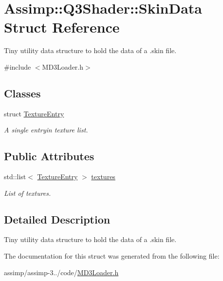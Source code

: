 \hypertarget{struct_assimp_1_1_q3_shader_1_1_skin_data}{\section{Assimp\+:\+:Q3\+Shader\+:\+:Skin\+Data Struct Reference}
\label{struct_assimp_1_1_q3_shader_1_1_skin_data}
}


Tiny utility data structure to hold the data of a .skin file.  




{\ttfamily \#include $<$M\+D3\+Loader.\+h$>$}

\subsection*{Classes}
\begin{DoxyCompactItemize}
\item 
struct \hyperlink{struct_assimp_1_1_q3_shader_1_1_skin_data_1_1_texture_entry}{Texture\+Entry}
\begin{DoxyCompactList}\small\item\em A single entryin texture list. \end{DoxyCompactList}\end{DoxyCompactItemize}
\subsection*{Public Attributes}
\begin{DoxyCompactItemize}
\item 
\hypertarget{struct_assimp_1_1_q3_shader_1_1_skin_data_ac2f3c7b1b8779e6cfcb8f4a7867d5855}{std\+::list$<$ \hyperlink{struct_assimp_1_1_q3_shader_1_1_skin_data_1_1_texture_entry}{Texture\+Entry} $>$ \hyperlink{struct_assimp_1_1_q3_shader_1_1_skin_data_ac2f3c7b1b8779e6cfcb8f4a7867d5855}{textures}}\label{struct_assimp_1_1_q3_shader_1_1_skin_data_ac2f3c7b1b8779e6cfcb8f4a7867d5855}

\begin{DoxyCompactList}\small\item\em List of textures. \end{DoxyCompactList}\end{DoxyCompactItemize}


\subsection{Detailed Description}
Tiny utility data structure to hold the data of a .skin file. 

The documentation for this struct was generated from the following file\+:\begin{DoxyCompactItemize}
\item 
assimp/assimp-\/3../code/\hyperlink{_m_d3_loader_8h}{M\+D3\+Loader.\+h}\end{DoxyCompactItemize}
